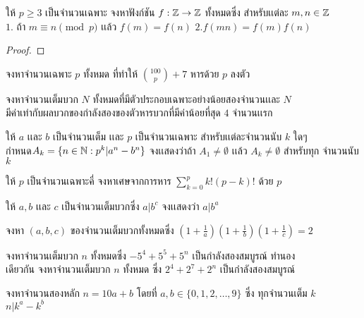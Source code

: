 \documentclass[a4paper,12pt]{scrartcl}
\begin{document}
	\begin{example}
			ให้ $p \ge 3$ เป็นจำนวนเฉพาะ จงหาฟังก์ชัน $f: \mathbb Z \rightarrow \mathbb Z$ ทั้งหมดซึ่ง สำหรับเเต่ละ $m,n \in \mathbb Z$\\ $1.$ ถ้า $m \equiv n \pmod p$ เเล้ว $f(m) = f(n)$ 
			\: $2. f(mn) = f(m)f(n)$ 
	\end{example}
\begin{proof}
\end{proof}
	\begin{example}
		จงหาจำนวนเฉพาะ $p$ ทั้งหมด ที่ทำให้ ${100 \choose p} + 7$ หารด้วย $p$ ลงตัว
	\end{example} 

	\begin{example}
		จงหาจำนวนเต็มบวก $N$ ทั้งหมดที่มีตัวประกอบเฉพาะอย่างน้อยสองจำนวนเเละ $N$\\ มีค่าเท่ากับผลบวกของกำลังสองของตัวหารบวกที่มีค่าน้อยที่สุด $4$ จำนวนเเรก
	\end{example}
	\begin{example}
		ให้ $a$ เเละ $b$ เป็นจำนวนเต็ม เเละ $p$   เป็นจำนวนเฉพาะ สำหรับเเต่ละจำนวนนับ $k$ ใดๆ\\ กำหนด$ A_k = \{ n \in \mathbb N : p^k | a^n-b^n \}$ จงเเสดงว่าถ้า $A_1 \neq \emptyset$ เเล้ว $A_k \neq \emptyset$ สำหรับทุก จำนวนนับ $k$
	\end{example}
	\begin{example}
		ให้ $p$ เป็นจำนวนเฉพาะคี่ จงหาเศษจากการหาร $ \displaystyle \sum_{k=0}^{p}k!(p-k)!$ ด้วย $p$
	\end{example}
	\begin{example}
		ให้ $a,b$ เเละ $c$ เป็นจำนวนเต็มบวกซึ่ง $a|b^c$ จงเเสดงว่า $a|b^a$
	\end{example}
	\begin{example}
		จงหา $(a,b,c)$ ของจำนวนเต็มบวกทั้งหมดซึ่ง $(1+\frac{1}{a})(1+\frac{1}{b})(1+\frac{1}{c}) = 2$
	\end{example}
	\begin{example}
		จงหาจำนวนเต็มบวก $n$ ทั้งหมดซึ่ง $-5^4+5^5+5^n$ เป็นกำลังสองสมบูรณ์ ทำนอง\\
		เดียวกัน จงหาจำนวนเต็มบวก $n$ ทั้งหมด ซึ่ง $2^4+2^7+2^n$ เป็นกำลังสองสมบูรณ์
	\end{example} 

	\begin{example}
		จงหาจำนวนสองหลัก $n = 10a+b$ โดยที่ $a,b \in \{ 0,1,2,\dots , 9 \}$ ซึ่ง ทุกจำนวนเต็ม $k$\\ $n | k^a-k^b$
	\end{example}
\end{document}
